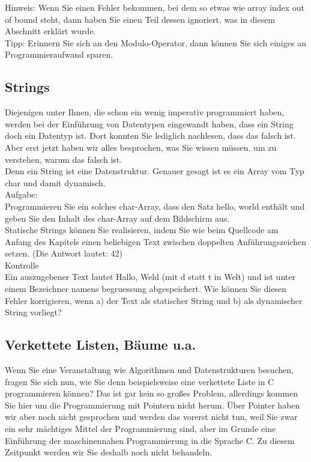 Hinweis: Wenn Sie einen Fehler bekommen, bei dem so etwas wie array index out of bound steht, dann haben Sie einen Teil dessen ignoriert, was in diesem Abschnitt erklärt wurde.\\

Tipp: Erinnern Sie sich an den Modulo-Operator, dann können Sie sich einiges an Programmieraufwand sparen.

\subsection{Strings}

Diejenigen unter Ihnen, die schon ein wenig imperativ programmiert haben, werden bei der Einführung von Datentypen eingewandt haben, dass ein String doch ein Datentyp ist. Dort konnten Sie lediglich nachlesen, dass das falsch ist. Aber erst jetzt haben wir alles besprochen, was Sie wissen müssen, um zu verstehen, warum das falsch ist.\\

Denn ein String ist eine Datenstruktur. Genauer gesagt ist es ein Array vom Typ char und damit dynamisch.\\

Aufgabe:\\

Programmieren Sie ein solches char-Array, dass den Satz hello, world enthält und geben Sie den Inhalt des char-Array auf dem Bildschirm aus.\\

Statische Strings können Sie realisieren, indem Sie wie beim Quellcode am Anfang des Kapitels einen beliebigen Text zwischen doppelten Anführungszeichen setzen. (\glqq{}Die Antwort lautet: 42\grqq{})\\

Kontrolle\\

Ein auszugebener Text lautet Hallo, Weld (mit d statt t in Welt) und ist unter einem Bezeichner namens begruessung abgespeichert. Wie können Sie diesen Fehler korrigieren, wenn a) der Text als statischer String und b) als dynamischer String vorliegt?

\subsection{Verkettete Listen, Bäume u.a.}

Wenn Sie eine Veranstaltung wie Algorithmen und Datenstrukturen besuchen, fragen Sie sich nun, wie Sie denn beispielsweise eine verkettete Liste in C programmieren können? Das ist gar kein so großes Problem, allerdings kommen Sie hier um die Programmierung mit Pointern nicht herum. Über Pointer haben wir aber noch nicht gesprochen und werden das vorerst nicht tun, weil Sie zwar ein sehr mächtiges Mittel der Programmierung sind, aber im Grunde eine Einführung der maschinennahen Programmierung in die Sprache C. Zu diesem Zeitpunkt werden wir Sie deshalb noch nicht behandeln. 

